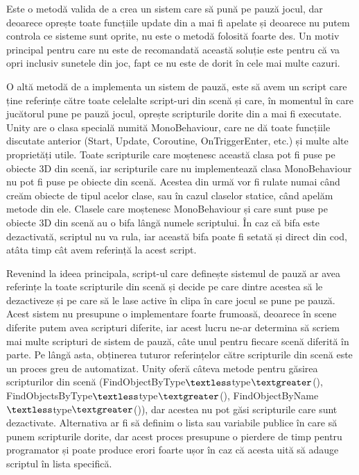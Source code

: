 \documentclass[12pt, a4paper]{article}
\begin{document}
	Este o metodă valida de a crea un sistem care să pună pe pauză jocul, dar deoarece oprește toate funcțiile update din a mai fi apelate și deoarece nu putem controla ce sisteme sunt oprite, nu este o metodă folosită foarte des. Un motiv principal pentru care nu este de recomandată această soluție este pentru că va opri inclusiv sunetele din joc, fapt ce nu este de dorit în cele mai multe cazuri.
	\newline
	
	O altă metodă de a implementa un sistem de pauză, este să avem un script care ține referințe către toate celelalte script-uri din scenă și care, în momentul în care jucătorul pune pe pauză jocul, oprește scripturile dorite din a mai fi executate. Unity are o clasa specială numită MonoBehaviour, care ne dă toate funcțiile discutate anterior (Start, Update, Coroutine, OnTriggerEnter, etc.) și multe alte proprietăți utile. Toate scripturile care moștenesc această clasa pot fi puse pe obiecte 3D din scenă, iar scripturile care nu implementează clasa MonoBehaviour nu pot fi puse pe obiecte din scenă. Acestea din urmă vor fi rulate numai când creăm obiecte de tipul acelor clase, sau în cazul claselor statice, când apelăm metode din ele. Clasele care moștenesc MonoBehaviour și care sunt puse pe obiecte 3D din scenă au o bifa lângă numele scriptului. În caz că bifa este dezactivată, scriptul nu va rula, iar această bifa poate fi setată și direct din cod, atâta timp cât avem referință la acest script. 
	\newline
	
	Revenind la ideea principala, script-ul care definește sistemul de pauză ar avea referințe la toate scripturile din scenă și decide pe care dintre acestea să le dezactiveze și pe care să le lase active în clipa în care jocul se pune pe pauză. Acest sistem nu presupune o implementare foarte frumoasă, deoarece în scene diferite putem avea scripturi diferite, iar acest lucru ne-ar determina să scriem mai multe scripturi de sistem de pauză, câte unul pentru fiecare scenă diferită în parte. Pe lângă asta, obținerea tuturor referințelor către scripturile din scenă este un proces greu de automatizat. Unity oferă câteva metode pentru găsirea scripturilor din scenă (FindObjectByType$\textless$type$\textgreater$(), FindObjectsByType$\textless$type$\textgreater$(), FindObjectByName$\textless$type$\textgreater$()), dar acestea nu pot găsi scripturile care sunt dezactivate. Alternativa ar fi să definim o lista sau variabile publice în care să punem scripturile dorite, dar acest proces presupune o pierdere de timp pentru programator și poate produce erori foarte ușor în caz că acesta uită să adauge scriptul în lista specifică.
	\newline
	
\end{document}
